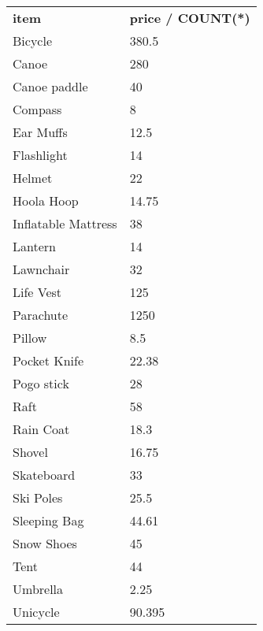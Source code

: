 \begin{tabular}{ll}
    {\textbf{item}}       & {\textbf{price / COUNT(*)}} \\
    {Bicycle}             & {380.5}                     \\
    {Canoe}               & {280}                       \\
    {Canoe paddle}        & {40}                        \\
    {Compass}             & {8}                         \\
    {Ear Muffs}           & {12.5}                      \\
    {Flashlight}          & {14}                        \\
    {Helmet}              & {22}                        \\
    {Hoola Hoop}          & {14.75}                     \\
    {Inflatable Mattress} & {38}                        \\
    {Lantern}             & {14}                        \\
    {Lawnchair}           & {32}                        \\
    {Life Vest}           & {125}                       \\
    {Parachute}           & {1250}                      \\
    {Pillow}              & {8.5}                       \\
    {Pocket Knife}        & {22.38}                     \\
    {Pogo stick}          & {28}                        \\
    {Raft}                & {58}                        \\
    {Rain Coat}           & {18.3}                      \\
    {Shovel}              & {16.75}                     \\
    {Skateboard}          & {33}                        \\
    {Ski Poles}           & {25.5}                      \\
    {Sleeping Bag}        & {44.61}                     \\
    {Snow Shoes}          & {45}                        \\
    {Tent}                & {44}                        \\
    {Umbrella}            & {2.25}                      \\
    {Unicycle}            & {90.395}                   
\end{tabular} \\ \\


